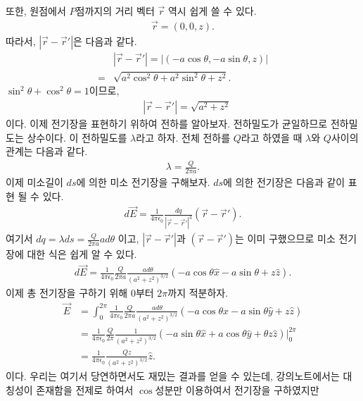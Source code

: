 \documentclass[tightenlines,floatfix,nofootinbib,superscriptaddress,fleqn]{revtex4-2}
\begin{document}
또한, 원점에서 $P$점까지의 거리 벡터 $\vec{r}$ 역시 쉽게 쓸 수 있다.
\begin{align}
  \vec{r}=\left(0,0,z\right).
\end{align}
따라서, $\left|\vec{r}-\vec{r}'\right|$은 다음과 같다.
\begin{align}
  &\left|\vec{r}-\vec{r}'\right|=\left|\left(-a\cos{\theta},-a\sin{\theta},z\right)\right|\\
  =&\sqrt{a^2\cos^2{\theta}+a^2\sin^2{\theta}+z^2}.
\end{align}
$\sin^2{\theta}+\cos^2{\theta}=1$이므로,
\begin{align}
  &\left|\vec{r}-\vec{r}'\right|=\sqrt{a^2+z^2}
\end{align}
이다. 이제 전기장을 표현하기 위하여 전하를 알아보자.
전하밀도가 균일하므로 전하밀도는 상수이다. 이 전하밀도를 $\lambda$라고 하자.
전체 전하를 $Q$라고 하였을 때 $\lambda$와 $Q$사이의 관계는 다음과 같다.
\begin{align}
  \lambda=\frac{Q}{2\pi a}.
\end{align}
이제 미소길이 $ds$에 의한 미소 전기장을 구해보자. $ds$에 의한 전기장은 다음과 같이 표현 될 수 있다.
\begin{align}
  d\vec{E}=\frac{1}{4\pi \epsilon_0}\frac{dq}{\left|\vec{r}-\vec{r}'\right|^3}\left(\vec{r}-\vec{r}'\right).
\end{align}
여기서 $dq=\lambda ds=\frac{Q}{2\pi a} a d\theta$ 이고, $\left|\vec{r}-\vec{r}'\right|$과 $\left(\vec{r}-\vec{r}'\right)$는 이미 구했으므로
미소 전기장에 대한 식은 쉽게 알 수 있다.
\begin{align}
  d\vec{E}=\frac{1}{4\pi \epsilon_0}\frac{Q}{2\pi a}\frac{a d\theta}{\left(a^2+z^2\right)^{3/2}}\left(-a\cos{\theta}\hat{x}-a\sin{\theta}+z\hat{z}\right).
\end{align}
이제 총 전기장을 구하기 위해 $0$부터 $2\pi$까지 적분하자.
\begin{align}
  \vec{E}&=\int^{2\pi}_{0}\frac{1}{4\pi \epsilon_0}\frac{Q}{2\pi a}\frac{a d\theta}{\left(a^2+z^2\right)^{3/2}}\left(-a\cos{\theta}\hat{x}-a\sin{\theta}\hat{y}+z\hat{z}\right)\\
  &=\frac{1}{4\pi \epsilon_0}\frac{Q}{2\pi}\frac{1}{\left(a^2+z^2\right)^{3/2}}\left(-a\sin{\theta}\hat{x}+a\cos{\theta}\hat{y}+\theta z\hat{z}\right)|^{2\pi}_0 \\
  &=\frac{1}{4 \pi \epsilon_0}\frac{Qz}{\left(a^2+z^2\right)^{3/2}}\hat{z}.
\end{align}
이다. 우리는 여기서 당연하면서도 재밌는 결과를 얻을 수 있는데, 강의노트에서는 대칭성이 존재함을 전제로 하여서 $\cos$성분만 이용하여서 전기장을 구하였지만
\end{document}
